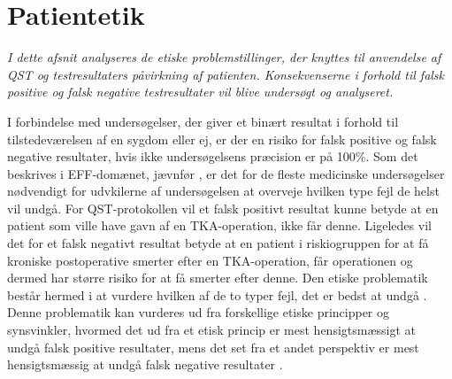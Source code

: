 \section{Patientetik}
\textit{I dette afsnit analyseres de etiske problemstillinger, der knyttes til anvendelse af QST og testresultaters påvirkning af patienten. Konsekvenserne i forhold til falsk positive og falsk negative testresultater vil blive undersøgt og analyseret.}

I forbindelse med undersøgelser, der giver et binært resultat i forhold til tilstedeværelsen af en sygdom eller ej, er der en risiko for falsk positive og falsk negative resultater, hvis ikke undersøgelsens præcision er på 100\%. Som det beskrives i EFF-domænet, jævnfør , er det for de fleste medicinske undersøgelser nødvendigt for udvkilerne af undersøgelsen at overveje hvilken type fejl de helst vil undgå. For QST-protokollen vil et falsk positivt resultat kunne betyde at en patient som ville have gavn af en TKA-operation, ikke får denne. Ligeledes vil det for et falsk negativt resultat betyde at en patient i riskiogruppen for at få kroniske postoperative smerter efter en TKA-operation, får operationen og dermed har større risiko for at få smerter efter denne. Den etiske problematik består hermed i at vurdere hvilken af de to typer fejl, det er bedst at undgå \citep{Kraemer2011}. \\
Denne problematik kan vurderes ud fra forskellige etiske principper og synsvinkler, hvormed det ud fra et etisk princip er mest hensigtsmæssigt at undgå falsk positive resultater, mens det set fra et andet perspektiv er mest hensigtsmæssig at undgå falsk negative resultater \citep{Kraemer2011}.      

